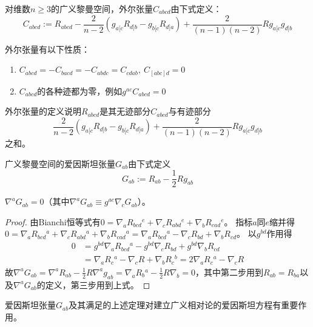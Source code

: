 \begin{definition}
对维数$n \geq 3$的广义黎曼空间，外尔张量$C_{abcd}$由下式定义：
$$C_{abcd} := R_{abcd} - \frac{2}{n - 2}(g_{a[c}R_{d]b} - g_{b[c}R_{d]a}) + \frac{2}{(n - 1)(n - 2)}Rg_{a[c}g_{d]b}$$
\end{definition}

\begin{theorem}
外尔张量有以下性质：
\begin{enumerate}[（1）]
\item $C_{abcd} = -C_{bacd} = -C_{abdc} = C_{cdab}, ~ C_{[abc]d} = 0$
\item $C_{abcd}$的各种迹都为零，例如$g^{ac}C_{abcd} = 0$
\end{enumerate}
\end{theorem}

\begin{note}
外尔张量的定义说明$R_{abcd}$是其无迹部分$C_{abcd}$与有迹部分
$$\frac{2}{n - 2}(g_{a[c}R_{d]b} - g_{b[c}R_{d]a}) + \frac{2}{(n - 1)(n - 2)}Rg_{a[c}g_{d]b}$$
之和。
\end{note}

\begin{definition}
广义黎曼空间的爱因斯坦张量$G_{ab}$由下式定义
$$G_{ab} := R_{ab} - \frac{1}{2}Rg_{ab}$$
\end{definition}

\begin{theorem}
$\nabla^aG_{ab} = 0$（其中$\nabla^aG_{ab} \equiv g^{ac}\nabla_cG_{ab}$）。
\end{theorem}

\begin{proof}
由Bianchi恒等式有$0 = \nabla_aR_{bcd}{}^e + \nabla_cR_{abd}{}^e + \nabla_bR_{cad}{}^e$。
指标$a$同$e$缩并得$0 = \nabla_aR_{bcd}{}^a + \nabla_cR_{abd}{}^a + \nabla_bR_{cad}{}^a = \nabla_aR_{bcd}{}^a - \nabla_cR_{bd} + \nabla_bR_{cd}$。
以$g^{bd}$作用得
$$\begin{aligned}
0 & = g^{bd}\nabla_aR_{bcd}{}^a - g^{bd}\nabla_cR_{bd} + g^{bd}\nabla_bR_{cd} \\
& = \nabla_aR_{c}{}^a - \nabla_cR + \nabla_bR_c{}^b = 2\nabla_aR_c{}^a - \nabla_cR
\end{aligned}$$
故$\nabla^aG_{ab} = \nabla^aR_{ab} - \frac{1}{2}R\nabla^ag_{ab} = \nabla_aR_{b}{}^a - \frac{1}{2}R\nabla_b = 0$，其中第二步用到$R_{ab} = R_{ba}$以及$\nabla^aG_{ab}$的定义，第三步用到上式。
\end{proof}

爱因斯坦张量$G_{ab}$及其满足的上述定理对建立广义相对论的爱因斯坦方程有重要作用。

